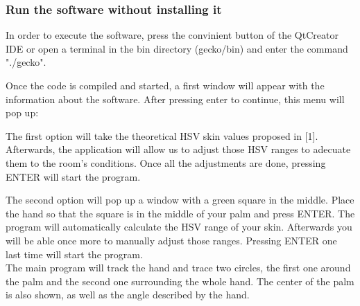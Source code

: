 \subsubsection{ Run the software without installing it}

In order to execute the software, press the convinient button of the QtCreator IDE or open a terminal in the bin directory (gecko/bin) and enter the command "./gecko". 

Once the code is compiled and started, a first window will appear with the information about the software. After pressing enter to continue, this menu will pop up: 
\begin{center}
\end{center}

\vspace{1cm}
The first option will take the theoretical HSV skin values proposed in [1]. Afterwards, the application will allow us to adjust those HSV ranges to adecuate them to the room's conditions. 
Once all the adjustments are done, pressing ENTER will start the program. 

The second option will pop up a window with a green square in the middle. Place the hand so that the square is in the middle of your palm and press ENTER. The program will automatically calculate the HSV range of your skin. Afterwards you will be able once more to manually adjust those ranges. Pressing ENTER one last time will start the program. 
\\
 
The main program will track the hand and trace two circles, the first one around the palm and the second one surrounding the whole hand. The center of the palm is also shown, as well as the angle described by the hand. 

